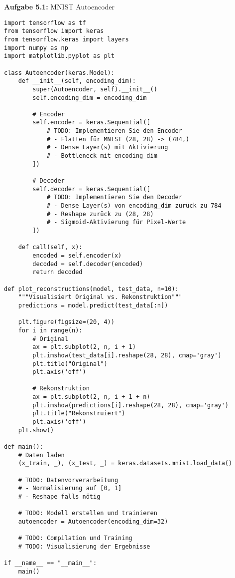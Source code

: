 \documentclass[12pt,a4paper]{article}
\begin{document}
\textbf{Aufgabe 5.1:} MNIST Autoencoder

\begin{lstlisting}[caption=Autoencoder für MNIST]
import tensorflow as tf
from tensorflow import keras
from tensorflow.keras import layers
import numpy as np
import matplotlib.pyplot as plt

class Autoencoder(keras.Model):
    def __init__(self, encoding_dim):
        super(Autoencoder, self).__init__()
        self.encoding_dim = encoding_dim
        
        # Encoder
        self.encoder = keras.Sequential([
            # TODO: Implementieren Sie den Encoder
            # - Flatten für MNIST (28, 28) -> (784,)
            # - Dense Layer(s) mit Aktivierung
            # - Bottleneck mit encoding_dim
        ])
        
        # Decoder  
        self.decoder = keras.Sequential([
            # TODO: Implementieren Sie den Decoder
            # - Dense Layer(s) von encoding_dim zurück zu 784
            # - Reshape zurück zu (28, 28)
            # - Sigmoid-Aktivierung für Pixel-Werte
        ])
    
    def call(self, x):
        encoded = self.encoder(x)
        decoded = self.decoder(encoded)
        return decoded

def plot_reconstructions(model, test_data, n=10):
    """Visualisiert Original vs. Rekonstruktion"""
    predictions = model.predict(test_data[:n])
    
    plt.figure(figsize=(20, 4))
    for i in range(n):
        # Original
        ax = plt.subplot(2, n, i + 1)
        plt.imshow(test_data[i].reshape(28, 28), cmap='gray')
        plt.title("Original")
        plt.axis('off')
        
        # Rekonstruktion
        ax = plt.subplot(2, n, i + 1 + n)
        plt.imshow(predictions[i].reshape(28, 28), cmap='gray')
        plt.title("Rekonstruiert")
        plt.axis('off')
    plt.show()

def main():
    # Daten laden
    (x_train, _), (x_test, _) = keras.datasets.mnist.load_data()
    
    # TODO: Datenvorverarbeitung
    # - Normalisierung auf [0, 1]
    # - Reshape falls nötig
    
    # TODO: Modell erstellen und trainieren
    autoencoder = Autoencoder(encoding_dim=32)
    
    # TODO: Compilation und Training
    # TODO: Visualisierung der Ergebnisse

if __name__ == "__main__":
    main()
\end{lstlisting}
\end{document}

